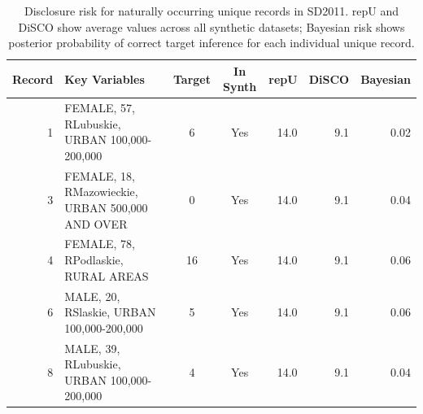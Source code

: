 \begin{table}[ht]
\centering
\caption{Disclosure risk for naturally occurring unique records in SD2011.
             repU and DiSCO show average values across all synthetic datasets;
             Bayesian risk shows posterior probability of correct target inference
             for each individual unique record.} 
\label{tab:sd2011_outliers}
\begin{tabular}{rlccrrr}
  \toprule
Record & Key Variables & Target & In Synth & repU & DiSCO & Bayesian \\ 
  \midrule
  1 & FEMALE, 57, RLubuskie, URBAN 100,000-200,000 & 6 & Yes & 14.0 & 9.1 & 0.02 \\ 
    3 & FEMALE, 18, RMazowieckie, URBAN 500,000 AND OVER & 0 & Yes & 14.0 & 9.1 & 0.04 \\ 
    4 & FEMALE, 78, RPodlaskie, RURAL AREAS & 16 & Yes & 14.0 & 9.1 & 0.06 \\ 
    6 & MALE, 20, RSlaskie, URBAN 100,000-200,000 & 5 & Yes & 14.0 & 9.1 & 0.06 \\ 
    8 & MALE, 39, RLubuskie, URBAN 100,000-200,000 & 4 & Yes & 14.0 & 9.1 & 0.04 \\ 
   \bottomrule
\end{tabular}
\end{table}
